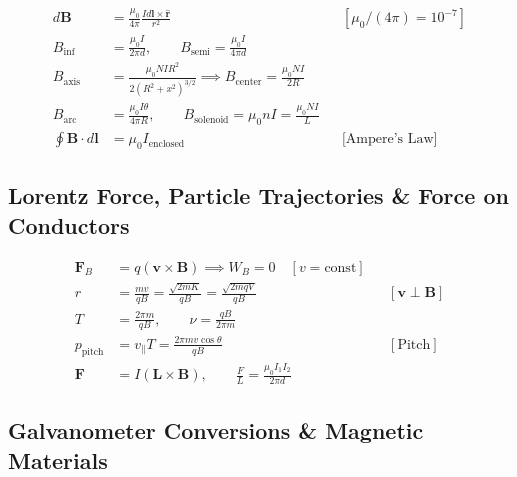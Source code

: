 \documentclass[10pt,twoside,openright]{book}
\begin{document}
\begin{formulabox}
\begin{align}
  d\mathbf{B} &= \frac{\mu_0}{4\pi}\frac{I d\mathbf{l}\times\hat{\mathbf{r}}}{r^2} && [\mu_0/(4\pi) = 10^{-7}] \\
  B_{\text{inf}} &= \frac{\mu_0 I}{2\pi d}, \qquad B_{\text{semi}} = \frac{\mu_0 I}{4\pi d} \\
  B_{\text{axis}} &= \frac{\mu_0 N I R^2}{2(R^2 + x^2)^{3/2}} \implies B_{\text{center}} = \frac{\mu_0 N I}{2R} \\
  B_{\text{arc}} &= \frac{\mu_0 I \theta}{4\pi R}, \qquad B_{\text{solenoid}} = \mu_0 n I = \frac{\mu_0 N I}{L} \\
  \oint \mathbf{B}\cdot d\mathbf{l} &= \mu_0 I_{\text{enclosed}} && \text{[Ampere's Law]}
\end{align}
\end{formulabox}

\subsection{Lorentz Force, Particle Trajectories \& Force on Conductors}

\begin{formulabox}
\begin{align}
  \mathbf{F}_B &= q(\mathbf{v}\times\mathbf{B}) \implies W_B = 0 \quad [v = \text{const}] \\
  r &= \frac{mv}{qB} = \frac{\sqrt{2mK}}{qB} = \frac{\sqrt{2mqV}}{qB} && [\mathbf{v}\perp\mathbf{B}] \\
  T &= \frac{2\pi m}{qB}, \qquad \nu = \frac{qB}{2\pi m} \\
  p_{\text{pitch}} &= v_{\parallel} T = \frac{2\pi m v\cos\theta}{qB} && [\text{Pitch}] \\
  \mathbf{F} &= I(\mathbf{L}\times\mathbf{B}), \qquad \frac{F}{L} = \frac{\mu_0 I_1 I_2}{2\pi d}
\end{align}
\end{formulabox}

\subsection{Galvanometer Conversions \& Magnetic Materials}
\end{document}
